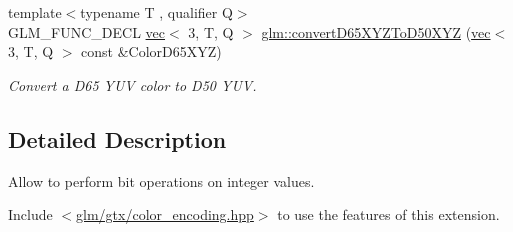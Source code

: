 \begin{DoxyCompactItemize}
\mbox{\label{group__gtx__color__encoding_gad12f4f65022b2c80e33fcba2ced0dc48}} 
{\footnotesize template$<$typename T , qualifier Q$>$ }\\G\+L\+M\+\_\+\+F\+U\+N\+C\+\_\+\+D\+E\+CL \hyperlink{structglm_1_1vec}{vec}$<$ 3, T, Q $>$ \hyperlink{group__gtx__color__encoding_gad12f4f65022b2c80e33fcba2ced0dc48}{glm\+::convert\+D65\+X\+Y\+Z\+To\+D50\+X\+YZ} (\hyperlink{structglm_1_1vec}{vec}$<$ 3, T, Q $>$ const \&Color\+D65\+X\+YZ)
\begin{DoxyCompactList}\small\item\em Convert a D65 Y\+UV color to D50 Y\+UV. \end{DoxyCompactList}\end{DoxyCompactItemize}


\subsection{Detailed Description}
Allow to perform bit operations on integer values. 

Include $<$\hyperlink{color__encoding_8hpp}{glm/gtx/color\+\_\+encoding.\+hpp}$>$ to use the features of this extension. 